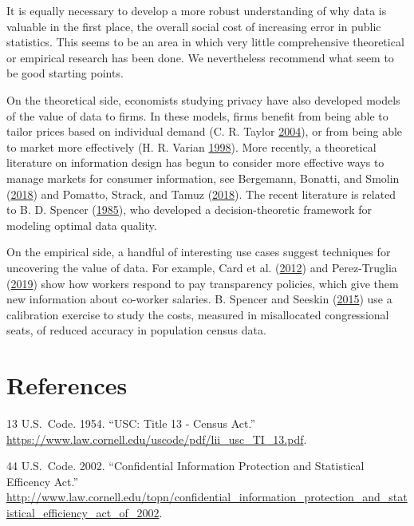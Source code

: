 \documentclass[]{article}
\begin{document}
It is equally necessary to develop a more robust understanding of why
data is valuable in the first place, the overall social cost of
increasing error in public statistics. This seems to be an area in which
very little comprehensive theoretical or empirical research has been
done. We nevertheless recommend what seem to be good starting points.

On the theoretical side, economists studying privacy have also developed
models of the value of data to firms. In these models, firms benefit
from being able to tailor prices based on individual demand (C. R.
Taylor \protect\hyperlink{ref-Taylor:Consumer:RAND:2004}{2004}), or from
being able to market more effectively (H. R. Varian
\protect\hyperlink{ref-Varian1998}{1998}). More recently, a theoretical
literature on information design has begun to consider more effective
ways to manage markets for consumer information, see Bergemann, Bonatti,
and Smolin (\protect\hyperlink{ref-10.1257ux2faer.20161079}{2018}) and
Pomatto, Strack, and Tamuz
(\protect\hyperlink{ref-PomattoTheCostOfInformation2018}{2018}). The
recent literature is related to B. D. Spencer
(\protect\hyperlink{ref-Spencer:Optimal:JASA:1985}{1985}), who developed
a decision-theoretic framework for modeling optimal data quality.

On the empirical side, a handful of interesting use cases suggest
techniques for uncovering the value of data. For example, Card et al.
(\protect\hyperlink{ref-CardAER2012}{2012}) and Perez-Truglia
(\protect\hyperlink{ref-perez-truglia:transparency:SSRN:2016}{2019})
show how workers respond to pay transparency policies, which give them
new information about co-worker salaries. B. Spencer and Seeskin
(\protect\hyperlink{ref-Seeskin:Spencer:Effects:2015}{2015}) use a
calibration exercise to study the costs, measured in misallocated
congressional seats, of reduced accuracy in population census data.

\section{References}\label{references}

\hypertarget{refs}{}
\hypertarget{ref-title13}{}
13 U.S.~Code. 1954. ``USC: Title 13 - Census Act.''
\url{https://www.law.cornell.edu/uscode/pdf/lii_usc_TI_13.pdf}.

\hypertarget{ref-cipsea}{}
44 U.S.~Code. 2002. ``Confidential Information Protection and
Statistical Efficency Act.''
\url{http://www.law.cornell.edu/topn/confidential_information_protection_and_statistical_efficiency_act_of_2002}.
\end{document}

